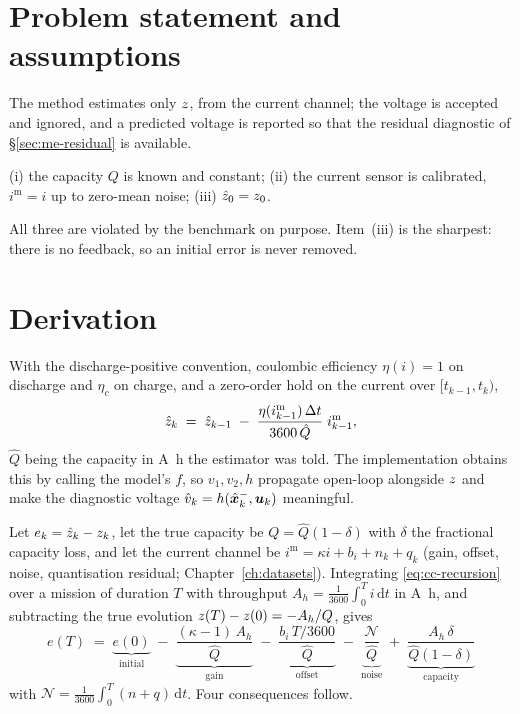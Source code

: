 \section{Problem statement and assumptions}
The method estimates only $z$, from the current channel; the voltage is accepted and ignored, and
a predicted voltage is reported so that the residual diagnostic of \S\ref{sec:me-residual} is
available.
\begin{assumption}\label{as:cc-all}
(i) the capacity $Q$ is known and constant; (ii) the current sensor is calibrated,
$i^{\text{m}} = i$ up to zero-mean noise; (iii) $\hat{z}_0 = z_0$.
\end{assumption}
All three are violated by the benchmark on purpose. Item~(iii) is the sharpest: there is no
feedback, so an initial error is never removed.

\section{Derivation}
With the discharge-positive convention, coulombic efficiency $\eta(i)=1$ on discharge and $\eta_c$
on charge, and a zero-order hold on the current over $[t_{k-1},t_k)$,
\begin{equation}
\hat{z}_{k} \;=\; \hat{z}_{k-1} \;-\; \frac{\eta(i^{\text{m}}_{k-1})\,\Delta t}{3600\,\hat Q}\; i^{\text{m}}_{k-1},
\label{eq:cc-recursion}
\end{equation}
$\hat Q$ being the capacity in \si{\ampere\hour} the estimator was told. The implementation obtains
this by calling the model's $f$, so $v_1,v_2,h$ propagate open-loop alongside $z$ and make the
diagnostic voltage $\hat v_k = h(\hat{\bm{x}}^{-}_k,\bm{u}_k)$ meaningful.

Let $e_k = \hat{z}_k - z_k$, let the true capacity be $Q = \hat Q(1-\delta)$ with $\delta$ the
fractional capacity loss, and let the current channel be $i^{\text{m}} = \kappa i + b_i + n_k + q_k$
(gain, offset, noise, quantisation residual; Chapter~\ref{ch:datasets}). Integrating
\eqref{eq:cc-recursion} over a mission of duration $T$ with throughput
$A_h = \frac{1}{3600}\int_0^T i\,\mathrm{d}t$ in \si{\ampere\hour}, and subtracting the true
evolution $z(T)-z(0) = -A_h/Q$, gives
\begin{equation}
\boxed{\;
e(T) \;=\; \underbrace{e(0)}_{\text{initial}}
\;-\;\underbrace{\frac{(\kappa-1)\,A_h}{\hat Q}}_{\text{gain}}
\;-\;\underbrace{\frac{b_i\,T/3600}{\hat Q}}_{\text{offset}}
\;-\;\underbrace{\frac{\mathcal{N}}{\hat Q}}_{\text{noise}}
\;+\;\underbrace{\frac{A_h\,\delta}{\hat Q(1-\delta)}}_{\text{capacity}} \; }
\label{eq:cc-drift}
\end{equation}
with $\mathcal{N} = \frac{1}{3600}\int_0^T(n+q)\,\mathrm{d}t$. Four consequences follow.

